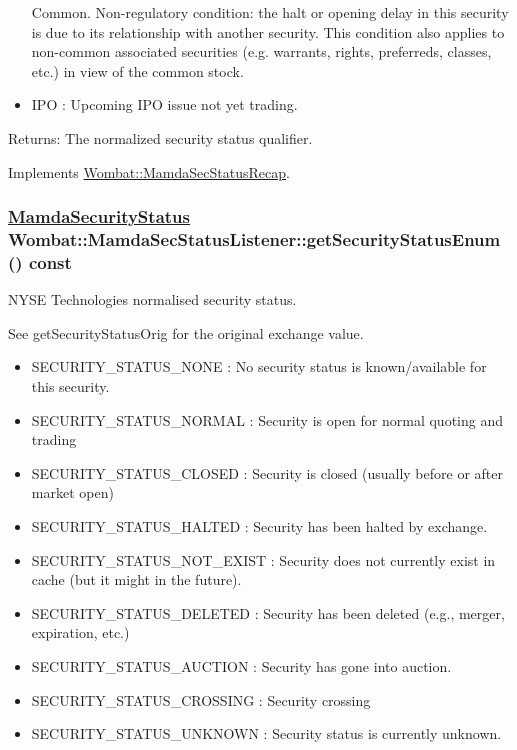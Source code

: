 \begin{itemize}
Common. Non-regulatory condition: the halt or opening delay in this security is due to its relationship with another security. This condition also applies to non-common associated securities (e.g. warrants, rights, preferreds, classes, etc.) in view of the common stock. \item IPO : Upcoming IPO issue not yet trading. \end{itemize}


\begin{Desc}
\item[Returns:]The normalized security status qualifier. \end{Desc}


Implements \hyperlink{classWombat_1_1MamdaSecStatusRecap_770dd1fad1b1e74527b98062e0426759}{Wombat::Mamda\-Sec\-Status\-Recap}.\hypertarget{classWombat_1_1MamdaSecStatusListener_2cff8818f54794f33a5b0a697bd8215a}{
\subsubsection[getSecurityStatusEnum]{\setlength{\rightskip}{0pt plus 5cm}\hyperlink{namespaceWombat_073e683b7aeffa26cf3d2791dda32b4b}{Mamda\-Security\-Status} Wombat::Mamda\-Sec\-Status\-Listener::get\-Security\-Status\-Enum () const}}
\label{classWombat_1_1MamdaSecStatusListener_2cff8818f54794f33a5b0a697bd8215a}


NYSE Technologies normalised security status. 

See get\-Security\-Status\-Orig for the original exchange value.

\begin{itemize}
\item SECURITY\_\-STATUS\_\-NONE : No security status is known/available for this security. \item SECURITY\_\-STATUS\_\-NORMAL : Security is open for normal quoting and trading \item SECURITY\_\-STATUS\_\-CLOSED : Security is closed (usually before or after market open) \item SECURITY\_\-STATUS\_\-HALTED : Security has been halted by exchange. \item SECURITY\_\-STATUS\_\-NOT\_\-EXIST : Security does not currently exist in cache (but it might in the future). \item SECURITY\_\-STATUS\_\-DELETED : Security has been deleted (e.g., merger, expiration, etc.)  \item SECURITY\_\-STATUS\_\-AUCTION : Security has gone into auction. \item SECURITY\_\-STATUS\_\-CROSSING : Security crossing \item SECURITY\_\-STATUS\_\-UNKNOWN : Security status is currently unknown. \end{itemize}


